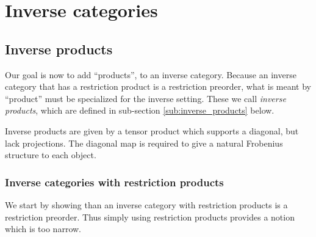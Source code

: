 \chapter{Inverse categories} %
\label{cha:inverse_categories}
\section{Inverse products} %
\label{sec:inverse_products}

Our goal is now to add ``products'', to an inverse category. Because an inverse category that has a
restriction product is a restriction preorder, what is meant by ``product'' must be specialized for
the inverse setting. These we call \emph{inverse products}, which are defined in sub-section
\vref{sub:inverse_products} below.

Inverse products are given by a tensor product which supports a diagonal, but lack projections. The
diagonal map is required to give a natural Frobenius structure to each object.

\subsection{Inverse categories with restriction products} %
\label{sub:inverse_categories_with_restriction_products}
We start by showing than an inverse category with restriction products is a restriction preorder.
Thus simply using restriction products provides a notion which is too narrow.

